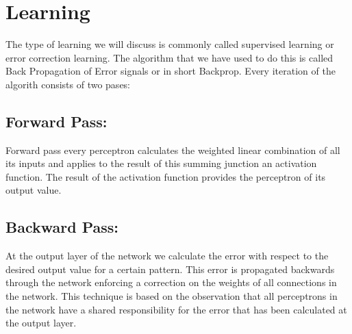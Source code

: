 \documentclass{report}
\begin{document}


\section{Learning}
The type of learning we will discuss is commonly called supervised learning or error correction learning. The algorithm that we have used to do this is called Back Propagation of Error signals or in short Backprop. Every iteration of the algorith consists of two pases: 

\subsection{Forward Pass: }
Forward pass every perceptron calculates the weighted linear combination of all its inputs and applies to the result of this summing junction an activation function. The result of the activation function provides the perceptron of its output value.

\subsection{Backward Pass: }
 At the output layer of the network we calculate the error with respect to the desired output value for a certain pattern. This error is propagated backwards through the network enforcing a correction on the weights of all connections in the network. This technique is based on the observation that all perceptrons in the network have a shared  responsibility for the error that has been calculated at the output layer.




\end{document}
